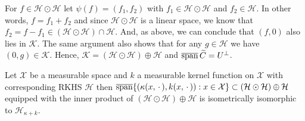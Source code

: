 \documentclass[AHL,Unicode,longabstracts,published]{cedram}
\theoremstyle{remark}
\DeclareMathOperator{\cspn}{\overline{span}}
\newcommand{\X}{\mathcal{X}}
\newcommand{\cH}{\mathcal{H}}
\newcommand{\clK}{\mathcal{K}}
\let\oldtilde\tilde
\renewcommand*{\tilde}[1]{\mathchoice{\widetilde{#1}}{\widetilde{#1}}{\oldtilde{#1}}{\oldtilde{#1}}}
\begin{document}
For $f\in \cH \odot \cH$ let $\psi(f) = (f_1,f_2)$ with $f_1 \in \cH\odot \cH$ and $f_2 \in \cH$. In other words, $f = f_1 + f_2$ and since $\cH \odot \cH$ is a linear space, we know that $f_2 = f - f_1 \in (\cH \odot \cH) \cap \cH$. And, as above, we can conclude that $(f, 0)$ also lies in $\clK$. The same argument also shows that for any $g \in \cH$ we have $(0,g) \in \clK$. Hence, $\clK = (\cH \odot \cH) \oplus \cH$ and $\cspn \tilde C = U^\perp$.



\begin{lemm}\label{lem:iso_iso_quotient}
Let $\X$ be a measurable space and $k$ a measurable kernel function on $\X$ with corresponding RKHS $\cH$ then $\cspn\{(\kappa(x,\,\cdot\,), k(x,\,\cdot\,)) : x \in \X \} \subset\linebreak (\cH \odot \cH) \oplus \cH$ equipped with the inner product of $(\cH \odot \cH) \oplus \cH$ is isometrically isomorphic to $\cH_{\kappa + k}$.
\end{lemm}
\end{document}
